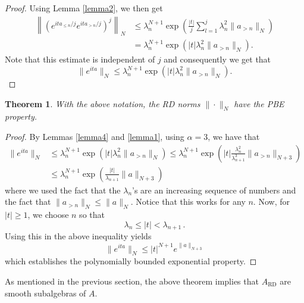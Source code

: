 \documentclass[12pt,reqno]{amsart}
\numberwithin{equation}{section}
\newtheorem{theo}{{\sc \bf Theorem}}[section]
\begin{document}
\begin{proof}
Using Lemma \ref{lemma2}, we then get 
\begin{equation*}
\begin{aligned}
\left\|\left(e^{ita_{\leq n}/j}e^{ita_{> n}/j}\right)^j\right\|_{N}  &\le \lambda_n^{N+1} \exp\left(\frac{|t|}{j} \sum_{l=1}^j \lambda_n^2\|a_{>n}\|_{N}\right)\\
&=\lambda_n^{N+1} \exp\left(|t|\lambda_n^2 \|a_{> n}\|_{N}\right).
\end{aligned}
\end{equation*}
Note that this estimate is independent of $j$ and consequently we get that 
\begin{equation*}
\|e^{ita}\|_{N} \le \lambda_n^{N+1} \exp\left(|t|\lambda_n^2 \|a_{> n}\|_{N}\right).
\end{equation*}
\end{proof}

\begin{theo}
With the above notation, the RD norms $\|\cdot\|_N$ have the PBE property.
\end{theo}

\begin{proof}
By Lemmas \ref{lemma4} and \ref{lemma1}, using $\alpha=3$, we have that
\begin{equation*}
\begin{aligned}
\|e^{ita}\|_N &\le\lambda_n^{N+1}\exp{\left(|t|\lambda_n^2\|a_{>n}\|_N\right)}\le\lambda_n^{N+1}\exp{\left(|t|\frac{\lambda_n^2}{\lambda_{n+1}^3}\|a_{>n}\|_{N+3}\right)}\\
&\le \lambda_n^{N+1}\exp{\left(\frac{|t|}{\lambda_{n+1}}\|a\|_{N+3}\right)}
\end{aligned}
\end{equation*}
where we used the fact that the $\lambda_n$'s are an increasing sequence of numbers and the fact that $\|a_{>n}\|_N\le \|a\|_N$. Notice that this works for any $n$. Now, for $|t|\ge1$, we choose $n$ so that 
\begin{equation*}
\lambda_n\le |t|<\lambda_{n+1}\,.
\end{equation*}
Using this in the above inequality yields
\begin{equation*}
\|e^{ita}\|_N\le|t|^{N+1}e^{\|a\|_{N+3}}
\end{equation*}
which establishes the polynomially bounded exponential property.
\end{proof}

As mentioned in the previous section, the above theorem implies that $A_\textrm{RD}$ are smooth subalgebras of $A$.
\end{document}
